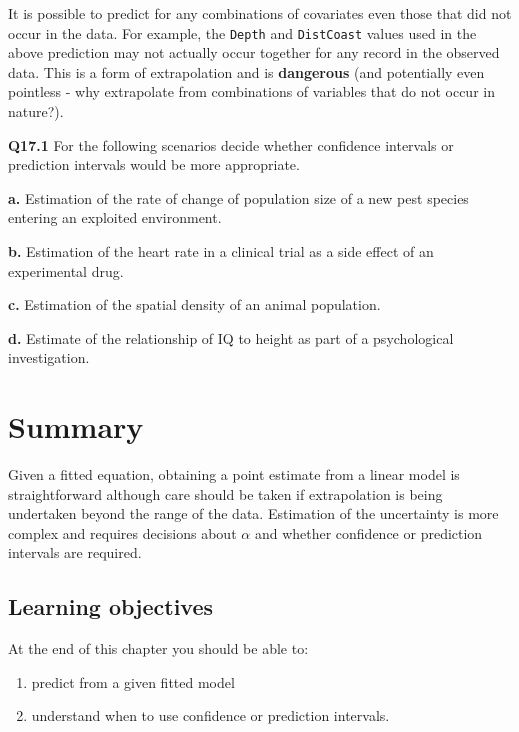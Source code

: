 \documentclass[
  oneside]{krantz}
\providecommand{\tightlist}{%
  \setlength{\itemsep}{0pt}\setlength{\parskip}{0pt}}
\begin{document}
It is possible to predict for any combinations of covariates even those that did not occur in the data. For example, the \texttt{Depth} and \texttt{DistCoast} values used in the above prediction may not actually occur together for any record in the observed data. This is a form of extrapolation and is \textbf{dangerous} (and potentially even pointless - why extrapolate from combinations of variables that do not occur in nature?).

\textbf{Q17.1} For the following scenarios decide whether confidence intervals or prediction intervals would be more appropriate.

\textbf{a.} Estimation of the rate of change of population size of a new pest species entering an exploited environment.

\textbf{b.} Estimation of the heart rate in a clinical trial as a side effect of an experimental drug.

\textbf{c.} Estimation of the spatial density of an animal population.

\textbf{d.} Estimate of the relationship of IQ to height as part of a psychological investigation.

\hypertarget{SUMpred}{%
\section{Summary}\label{SUMpred}}

Given a fitted equation, obtaining a point estimate from a linear model is straightforward although care should be taken if extrapolation is being undertaken beyond the range of the data. Estimation of the uncertainty is more complex and requires decisions about \(\alpha\) and whether confidence or prediction intervals are required.

\hypertarget{learning-objectives-5}{%
\subsection{Learning objectives}\label{learning-objectives-5}}

At the end of this chapter you should be able to:

\begin{enumerate}
\def\labelenumi{\arabic{enumi}.}
\tightlist
\item
  predict from a given fitted model
\item
  understand when to use confidence or prediction intervals.
\end{enumerate}
\end{document}
